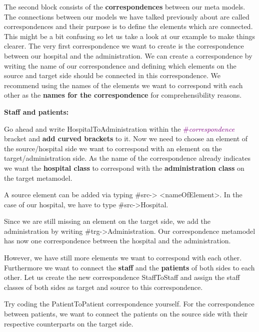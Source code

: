 The second block consists of the \textbf{correspondences} between our meta models. The connections between our models we have talked previously about are called correspondences and their purpose is to define the elements which are connected. This might be a bit confusing so let us take a look at our example to make things clearer. The very first correspondence we want to create is the correspondence between our hospital and the administration. We can create a correspondence by writing the name of our correspondence and defining which elements on the source and target side should be connected in this correspondence. We recommend using the names of the elements we want to correspond with each other as the \textbf{names for the correspondence} for comprehensibility reasons.\newline

\textbf{Staff and patients:}

Go ahead and write \textsf{HospitalToAdministration} within the \textcolor{Purple}{\#\textit{correspondence}} bracket and \textbf{add curved brackets} to it.
Now we need to choose an element of the source/hospital side we want to correspond with an element on the target/administration side. As the name of the correspondence already indicates we want the \textbf{hospital class} to correspond with the \textbf{administration class} on the target metamodel.

A source element can be added via typing \textsf{\#src-> <nameOfElement>}. In the case of our hospital, we have to type \textsf{\#src->Hospital}.

Since we are still missing an element on the target side, we add the administration by writing \textsf{\#trg->Administration}. Our correspondence metamodel has now one correspondence between the hospital and the administration.\newline

However, we have still more elements we want to correspond with each other. Furthermore we want to connect the \textbf{staff} and the \textbf{patients} of both sides to each other. Let us create the new correspondence \textsf{StaffToStaff} and assign the staff classes of both sides as target and source to this correspondence.\newline

Try coding the \textsf{PatientToPatient} correspondence yourself. For the correspondence between patients, we want to connect the patients on the source side with their respective counterparts on the target side.

